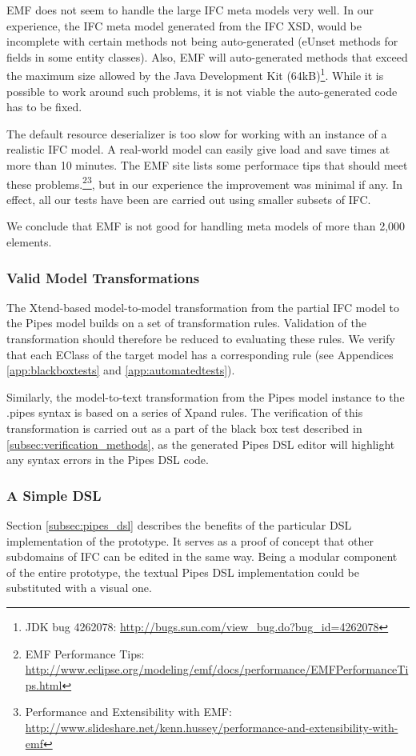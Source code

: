 EMF does not seem to handle the large IFC meta models very well. In our experience, the IFC meta model generated from the IFC XSD, would be incomplete with certain methods not being auto-generated (eUnset methods for fields in some entity classes). Also, EMF will auto-generated methods that exceed the maximum size allowed by the Java Development Kit (64kB)\footnote{JDK bug 4262078: \url{http://bugs.sun.com/view_bug.do?bug_id=4262078}}. While it is possible to work around such problems, it is not viable the auto-generated code has to be fixed.

The default resource deserializer is too slow for working with an instance of a realistic IFC model. A real-world model can easily give load and save times at more than 10 minutes. The EMF site lists some performace tips that should meet these problems.\footnote{EMF Performance Tips: \url{http://www.eclipse.org/modeling/emf/docs/performance/EMFPerformanceTips.html}}\footnote{Performance and Extensibility with EMF: \url{http://www.slideshare.net/kenn.hussey/performance-and-extensibility-with-emf}}, but in our experience the improvement was minimal if any. In effect, all our tests have been are carried out using smaller subsets of IFC.

We conclude that EMF is not good for handling meta models of more than 2,000 elements.

\subsubsection{Valid Model Transformations} The Xtend-based model-to-model transformation from the partial IFC model to the Pipes model builds on a set of transformation rules. Validation of the transformation should therefore be reduced to evaluating these rules. We verify that each EClass of the target model has a corresponding rule (see Appendices \ref{app:blackboxtests} and \ref{app:automatedtests}).

Similarly, the model-to-text transformation from the Pipes model instance to the .pipes syntax is based on a series of Xpand rules. The verification of this transformation is carried out as a part of the black box test described in \ref{subsec:verification_methods}, as the generated Pipes DSL editor will highlight any syntax errors in the Pipes DSL code.

\subsubsection{A Simple DSL} Section \ref{subsec:pipes_dsl} describes the benefits of the particular DSL implementation of the prototype. It serves as a proof of concept that other subdomains of IFC can be edited in the same way. Being a modular component of the entire prototype, the textual Pipes DSL implementation could be substituted with a visual one.

